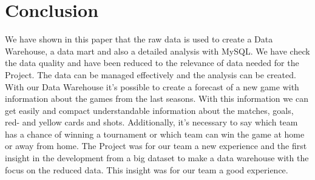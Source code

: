 \documentclass[11pt, journal]{IEEEtran}
\begin{document}
\section{Conclusion} \label{sec:concl}
We have shown in this paper that the raw data is used to create a Data Warehouse, a data mart and also a detailed analysis with MySQL. We have check the data quality and have been reduced to the relevance of data needed for the Project. The data can be managed effectively and the analysis can be created. With our Data Warehouse it’s possible to create a forecast of a new game with information about the games from the last seasons. With this information we can get easily and compact understandable information about the matches, goals, red- and yellow cards and shots. Additionally, it’s necessary to say which team has a chance of winning a tournament or which team can win the game at home or away from home. The Project was for our team a new experience and the first insight in the development from a big dataset to make a data warehouse with the focus on the reduced data. This insight was for our team a good experience. 



\end{document}
